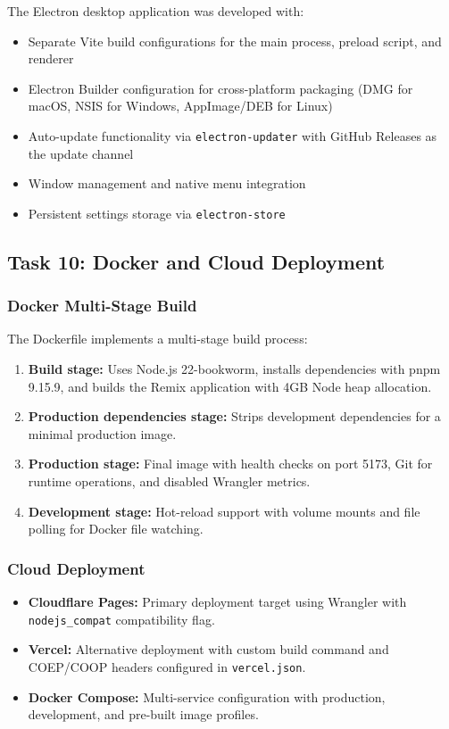 \documentclass[12pt,a4paper,openany]{report}
\begin{document}
The Electron desktop application was developed with:
\begin{itemize}
    \item Separate Vite build configurations for the main process, preload script, and renderer
    \item Electron Builder configuration for cross-platform packaging (DMG for macOS, NSIS for Windows, AppImage/DEB for Linux)
    \item Auto-update functionality via \texttt{electron-updater} with GitHub Releases as the update channel
    \item Window management and native menu integration
    \item Persistent settings storage via \texttt{electron-store}
\end{itemize}

\subsection{Task 10: Docker and Cloud Deployment}

\subsubsection{Docker Multi-Stage Build}
The Dockerfile implements a multi-stage build process:
\begin{enumerate}
    \item \textbf{Build stage:} Uses Node.js 22-bookworm, installs dependencies with pnpm 9.15.9, and builds the Remix application with 4GB Node heap allocation.
    \item \textbf{Production dependencies stage:} Strips development dependencies for a minimal production image.
    \item \textbf{Production stage:} Final image with health checks on port 5173, Git for runtime operations, and disabled Wrangler metrics.
    \item \textbf{Development stage:} Hot-reload support with volume mounts and file polling for Docker file watching.
\end{enumerate}

\subsubsection{Cloud Deployment}
\begin{itemize}
    \item \textbf{Cloudflare Pages:} Primary deployment target using Wrangler with \texttt{nodejs\_compat} compatibility flag.
    \item \textbf{Vercel:} Alternative deployment with custom build command and COEP/COOP headers configured in \texttt{vercel.json}.
    \item \textbf{Docker Compose:} Multi-service configuration with production, development, and pre-built image profiles.
\end{itemize}
\end{document}
